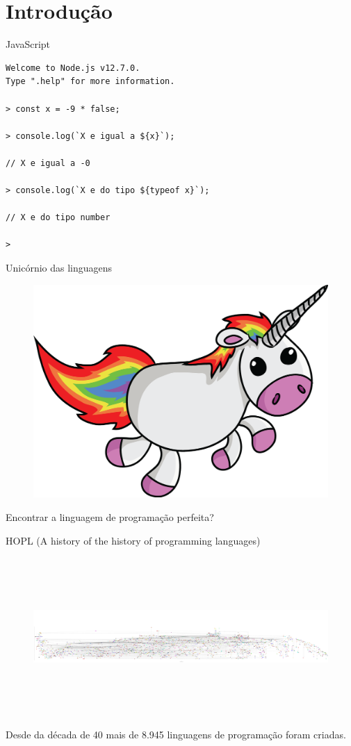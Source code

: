 \section{Introdução}

\begin{frame}[fragile]{JavaScript}
\lstset{language=Rust, style=boxed}
\begin{lstlisting}
Welcome to Node.js v12.7.0.
Type ".help" for more information.

> const x = -9 * false;

> console.log(`X e igual a ${x}`);

// X e igual a -0

> console.log(`X e do tipo ${typeof x}`);

// X e do tipo number

> 

\end{lstlisting}
\end{frame}

\begin{frame}[fragile]{Unicórnio das linguagens}
\begin{figure}[ht!]
  \centering
  \includegraphics[scale=0.19]{images/unicorn.png}
\end{figure}
\begin{center}
\small{Encontrar a linguagem de programação perfeita?}
\end{center}
\end{frame}

\begin{frame}[fragile]{HOPL (A history of the history of programming languages)}
\begin{figure}[ht!]
  \centering
  \includegraphics[width=\linewidth, height=6cm]{images/hopl.pdf}
\end{figure}
\small{Desde da década de 40 mais de 8.945 linguagens de programação foram criadas.}
\end{frame}